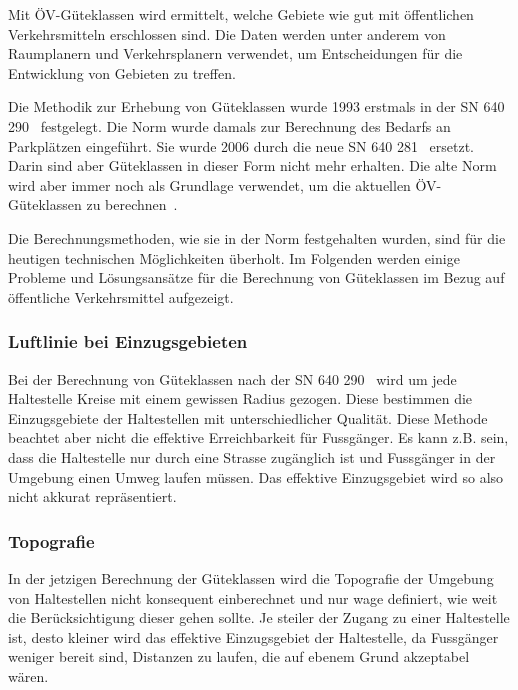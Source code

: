Mit \acs{ÖV}-Güteklassen wird ermittelt, welche Gebiete wie gut mit öffentlichen Verkehrsmitteln erschlossen sind.
Die Daten werden unter anderem von Raumplanern und Verkehrsplanern verwendet, um Entscheidungen für die Entwicklung von Gebieten zu treffen.

Die Methodik zur Erhebung von Güteklassen wurde 1993 erstmals in der \ac{SN} 640 290~\cite{sn640290} festgelegt.
Die Norm wurde damals zur Berechnung des Bedarfs an Parkplätzen eingeführt.
Sie wurde 2006 durch die neue \acs{SN} 640 281~\cite{sn640281} ersetzt.
Darin sind aber Güteklassen in dieser Form nicht mehr erhalten. Die alte Norm wird aber immer noch als Grundlage verwendet, um die aktuellen \acs{ÖV}-Güteklassen zu berechnen~\cite{berechnung_are}.

Die Berechnungsmethoden, wie sie in der Norm festgehalten wurden, sind für die heutigen technischen Möglichkeiten überholt.
Im Folgenden werden einige Probleme und Lösungsansätze für die Berechnung von Güteklassen im Bezug auf öffentliche Verkehrsmittel aufgezeigt.

\subsubsection{Luftlinie bei Einzugsgebieten}
\label{problem:Luftlinie bei Einzugsgebieten}

Bei der Berechnung von Güteklassen nach der \acs{SN} 640 290~\cite{sn640290} wird um jede Haltestelle Kreise mit einem gewissen Radius gezogen.
Diese bestimmen die Einzugsgebiete der Haltestellen mit unterschiedlicher Qualität.
Diese Methode beachtet aber nicht die effektive Erreichbarkeit für Fussgänger.
Es kann z.B. sein, dass die Haltestelle nur durch eine Strasse zugänglich ist und Fussgänger in der Umgebung einen Umweg laufen müssen.
Das effektive Einzugsgebiet wird so also nicht akkurat repräsentiert.

\subsubsection{Topografie}
\label{problem:Topografie}

In der jetzigen Berechnung der Güteklassen wird die Topografie der Umgebung von Haltestellen nicht konsequent einberechnet und nur wage definiert, wie weit die Berücksichtigung dieser gehen sollte.
Je steiler der Zugang zu einer Haltestelle ist, desto kleiner wird das effektive Einzugsgebiet der Haltestelle, da Fussgänger weniger bereit sind, Distanzen zu laufen, die auf ebenem Grund akzeptabel wären.


